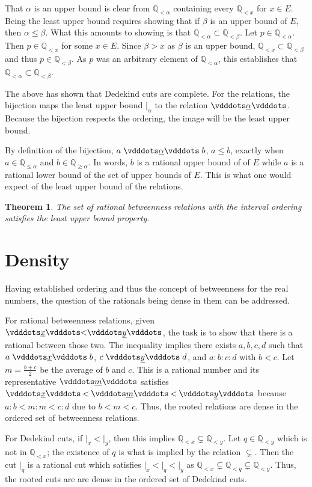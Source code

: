 \documentclass[12pt]{article}
\newtheorem{theorem}{Theorem}
\newcommand{\qcut}[2][x]{\ensuremath{\mathbb{Q}_{#2 #1}}}
\newcommand{\qlt}[1][x]{\qcut[#1]{<}}
\newcommand{\qgeq}[1][x]{\qcut[#1]{\geq}}
\newcommand{\qleq}[1][x]{\qcut[#1]{\leq}}
\newcommand{\cut}[1][x]{{\vert}_{#1} }
\newcommand{\yrel}{\xrel[y]}
\begin{document}
That $\alpha$ is an upper bound is clear from $\qlt[\alpha]$ containing every $\qlt$ for $x \in E$. Being the least upper bound requires showing that if $\beta$ is an upper bound of $E$, then $\alpha \leq \beta$. What this amounts to showing is that $\qlt[\alpha] \subset \qlt[\beta]$. Let $p \in \qlt[\alpha]$. Then $p \in \qlt$ for some $x \in E$. Since $\beta > x$ as $\beta$ is an upper bound, $\qlt \subset \qlt[\beta]$ and thus $p \in \qlt[\beta]$. As $p$ was an arbitrary element of $\qlt[\alpha]$, this  establishes that $\qlt[\alpha] \subset \qlt[\beta]$.

The above has shown that Dedekind cuts are complete. For the relations, the bijection  maps the least upper bound $\cut[\alpha]$ to the relation $\xrel[\alpha]$. Because the bijection respects the ordering, the image will be the least upper bound. 

By definition of the bijection, $a \xrel[\alpha] b$, $a \leq b$, exactly when $a \in \qleq [\alpha]$ and $b \in \qgeq[\alpha]$. In words, $b$ is a rational upper bound of of $E$ while $a$ is a rational lower bound of the set of upper bounds of $E$. This is what one would expect of the least upper bound of the relations. 

\begin{theorem}
    The set of rational betweenness relations with the interval ordering satisfies the least upper bound property. 
\end{theorem}

\section{Density}

Having established ordering and thus the concept of betweenness for the real numbers, the question of the rationals being dense in them can be addressed.

For rational betweenness relations, given $\xrel < \yrel$, the task is to show that there is a rational between those two. The inequality implies there exists $a,b,c,d$ such that $a \xrel b$, $c \xrel[y] d$, and $a:b:c:d$ with $b < c$. Let $m = \frac{b+c}{2}$ be the average of $b$ and $c$. This is a rational number and its representative $\xrel[m]$ satisfies $\xrel  \:<\: \xrel[m]  \:<\: \xrel[y]$ because $a:b < m:m < c:d$ due to $b < m < c$. Thus, the rooted relations are dense in the ordered set of betweenness relations. 

For Dedekind cuts, if $\cut < \cut[y]$, then this implies $\qlt \subsetneq \qlt[y]$. Let $q \in \qlt[y]$ which is not in $\qlt$; the existence of $q$ is what is implied by the relation $\subsetneq$. Then the cut $\cut[q]$ is a rational cut which satisfies $\cut < \cut[q] < \cut[y]$ as $\qlt \subsetneq \qlt[q] \subsetneq \qlt[y]$.  Thus, the rooted cuts are are dense in the ordered set of Dedekind cuts. 
\end{document}
